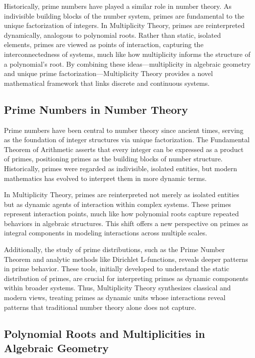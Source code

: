 \documentclass[12pt]{article}
\begin{document}
Historically, prime numbers have played a similar role in number theory. As indivisible building blocks of the number system, primes are fundamental to the unique factorization of integers. In Multiplicity Theory, primes are reinterpreted dynamically, analogous to polynomial roots. Rather than static, isolated elements, primes are viewed as points of interaction, capturing the interconnectedness of systems, much like how multiplicity informs the structure of a polynomial's root. By combining these ideas—multiplicity in algebraic geometry and unique prime factorization—Multiplicity Theory provides a novel mathematical framework that links discrete and continuous systems.

\subsection{Prime Numbers in Number Theory}

Prime numbers have been central to number theory since ancient times, serving as the foundation of integer structures via unique factorization. The Fundamental Theorem of Arithmetic asserts that every integer can be expressed as a product of primes, positioning primes as the building blocks of number structure. Historically, primes were regarded as indivisible, isolated entities, but modern mathematics has evolved to interpret them in more dynamic terms.

In Multiplicity Theory, primes are reinterpreted not merely as isolated entities but as dynamic agents of interaction within complex systems. These primes represent interaction points, much like how polynomial roots capture repeated behaviors in algebraic structures. This shift offers a new perspective on primes as integral components in modeling interactions across multiple scales.

Additionally, the study of prime distributions, such as the Prime Number Theorem and analytic methods like Dirichlet L-functions, reveals deeper patterns in prime behavior. These tools, initially developed to understand the static distribution of primes, are crucial for interpreting primes as dynamic components within broader systems. Thus, Multiplicity Theory synthesizes classical and modern views, treating primes as dynamic units whose interactions reveal patterns that traditional number theory alone does not capture.

\subsection{Polynomial Roots and Multiplicities in Algebraic Geometry}
\end{document}
